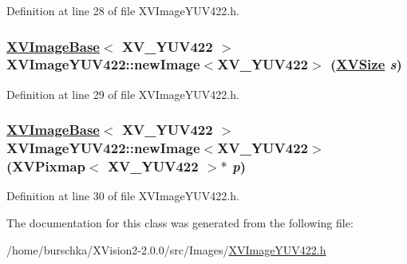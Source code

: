 Definition at line 28 of file XVImage\-YUV422.h.\label{XVImageYUV422_a8}
\hypertarget{class_XVImageYUV422_a8}{
\subsubsection[newImage]{\setlength{\rightskip}{0pt plus 5cm}\hyperlink{class_XVImageBase}{XVImage\-Base}$<$ XV\_\-YUV422 $>$ XVImage\-YUV422::new\-Image$<$XV\_\-YUV422$>$ (\hyperlink{class_XVSize}{XVSize} {\em s})}}




Definition at line 29 of file XVImage\-YUV422.h.\label{XVImageYUV422_a9}
\hypertarget{class_XVImageYUV422_a9}{
\subsubsection[newImage]{\setlength{\rightskip}{0pt plus 5cm}\hyperlink{class_XVImageBase}{XVImage\-Base}$<$ XV\_\-YUV422 $>$ XVImage\-YUV422::new\-Image$<$XV\_\-YUV422$>$ (XVPixmap$<$ XV\_\-YUV422 $>$$\ast$ {\em p})}}




Definition at line 30 of file XVImage\-YUV422.h.

The documentation for this class was generated from the following file:\begin{CompactItemize}
\item 
/home/burschka/XVision2-2.0.0/src/Images/\hyperlink{XVImageYUV422.h-source}{XVImage\-YUV422.h}\end{CompactItemize}
